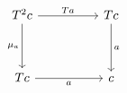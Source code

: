 \[\begin{tikzcd}
	{T^{2}c} && Tc \\
	\\
	Tc && c
	\arrow["a"', from=3-1, to=3-3]
	\arrow["a", from=1-3, to=3-3]
	\arrow["{\mu_{a}}"', from=1-1, to=3-1]
	\arrow["Ta", from=1-1, to=1-3]
\end{tikzcd}\]